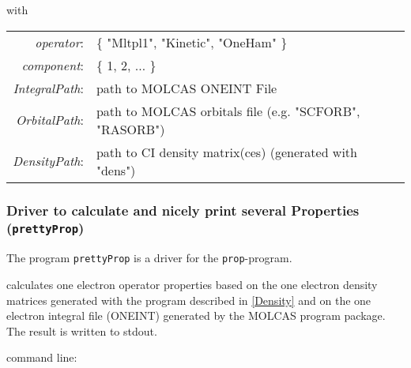 with

\begin{center}
\begin{tabular}{rl}
{\it operator}: &\{ "Mltpl1", "Kinetic", "OneHam" \}\\
{\it component}: &\{ 1, 2, $\ldots$ \}\\
{\it IntegralPath}: &path to MOLCAS ONEINT File\\
{\it OrbitalPath}: &path to MOLCAS orbitals file (e.g. "SCFORB", "RASORB")\\
{\it DensityPath}: &path to CI density matrix(ces) (generated with "dens")\\
\end{tabular}
\end{center}



\subsubsection{Driver to calculate and nicely print several Properties ({\tt prettyProp})}

The program {\tt prettyProp} is a driver for the {\tt prop}-program.

calculates one electron operator properties
based on the one electron density matrices generated with the program
described in \ref{Density} and on the one electron integral file
(ONEINT) generated by the MOLCAS program package. The result is
written to stdout.

\bigskip
command line:

%


